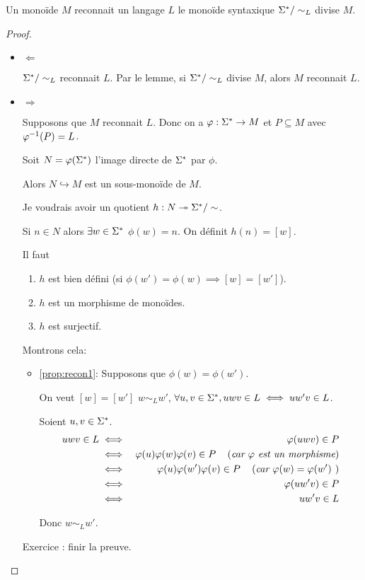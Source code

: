 \begin{prop}
	Un monoïde  $M$ reconnait  un langage $L$ \ssi le monoïde syntaxique $\Sigma^{*} / \sim_L$ divise $M$.
\end{prop}

\begin{proof}

	\begin{itemize}
		\item $\Leftarrow$

		      $\Sigma^{*} / \sim_L$ reconnait $L$. Par le lemme, si $\Sigma^{*} / \sim_L$ divise $M$, alors $M$ reconnait $L$.

		\item $\Rightarrow$

		      Supposons que $M$ reconnait $L$. Donc on a $\varphi : \Sigma^{*} \to M$ et $P \subseteq M$ avec $\varphi^{-1} (P) = L$.

		      Soit $N = \varphi (\Sigma^{*})$ l'image directe de $\Sigma^{*}$ par $\phi$.

		      Alors $N \hookrightarrow M$ est un sous-monoïde de $M$.

		      Je voudrais avoir un quotient $h : N \twoheadrightarrow \Sigma^{*}/\sim$.

		      Si $n \in N$ alors $\exists w \in \Sigma^{*}$ \tq $\phi(w) = n$. On définit $h(n) = [w]$.

		      Il faut \mq
		      \begin{enumerate}
			      \item $h$ est bien défini (si $\phi (w') = \phi (w) \implies [w] = [w']$). \label{prop:recon1}
			      \item $h$ est un morphisme de monoïdes.
			      \item $h$ est surjectif.
		      \end{enumerate}

		      Montrons cela:
		      \begin{itemize}
			      \item \ref{prop:recon1}: Supposons que $\phi(w) = \phi (w')$.

			            On veut \mq $[w]=[w']$ \cad $w \sim_L w'$, \cad $\forall u,v \in \Sigma^{*}, uwv \in L \iff uw'v \in L$.

			            Soient $u,v \in \Sigma^{*}$.
			            \begin{eqnarray*}
				            uwv \in L &\iff& \varphi (uwv) \in P\\
				            &\iff& \varphi (u)\varphi(w) \varphi(v) \in P \quad\left(\textit{car $\varphi$ est un morphisme}\right) \\
				            &\iff& \varphi (u)\varphi(w') \varphi(v) \in P \quad\left(\textit{car $\varphi (w) = \varphi (w')$ }\right) \\
				            &\iff& \varphi (uw'v) \in P\\
				            &\iff& uw'v \in L
			            \end{eqnarray*}

			            Donc $w \sim_L w'$.
		      \end{itemize}
		      Exercice : finir la preuve.
	\end{itemize}
\end{proof}
